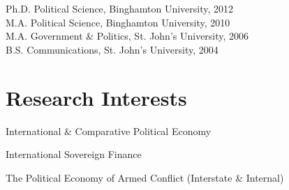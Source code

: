 \documentclass[letterpaper]{article}
\renewenvironment{itemize}{
  \begin{list}{}{
    \setlength{\leftmargin}{1.75em}
  }
}{
  \end{list}
}
\begin{document}
\begin{itemize}
  \item Ph.D. Political Science, Binghamton University, 2012\\ 
  M.A. Political Science, Binghamton University, 2010\\
   M.A. Government \& Politics, St. John's University, 2006\\
   B.S. Communications, St. John's University, 2004

\end{itemize}

\section*{Research Interests}
\begin{itemize}
\item	International \& Comparative Political Economy
\item 	International Sovereign Finance 
\item The Political Economy of Armed Conflict (Interstate \& Internal)
\end{itemize}
\end{document}

